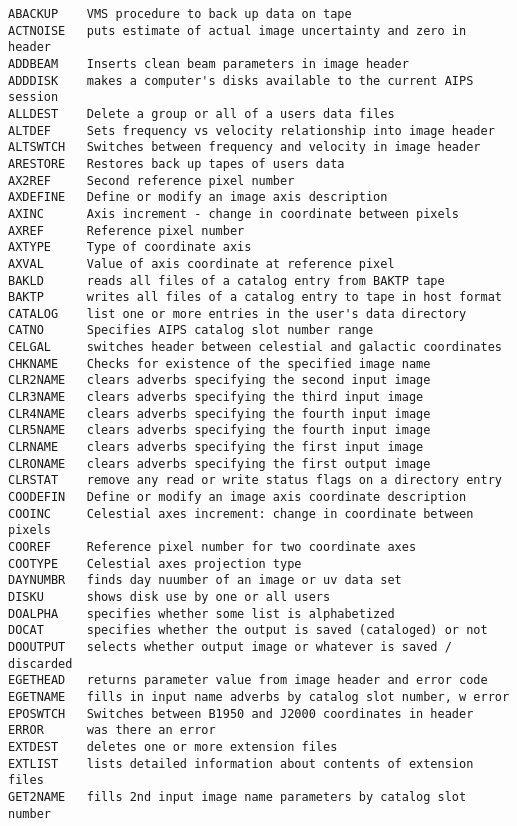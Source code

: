 \vskip 0.5pt
\bbve\begin{verbatim}
ABACKUP    VMS procedure to back up data on tape
ACTNOISE   puts estimate of actual image uncertainty and zero in header
ADDBEAM    Inserts clean beam parameters in image header
ADDDISK    makes a computer's disks available to the current AIPS session
ALLDEST    Delete a group or all of a users data files
ALTDEF     Sets frequency vs velocity relationship into image header
ALTSWTCH   Switches between frequency and velocity in image header
ARESTORE   Restores back up tapes of users data
AX2REF     Second reference pixel number
AXDEFINE   Define or modify an image axis description
AXINC      Axis increment - change in coordinate between pixels
AXREF      Reference pixel number
AXTYPE     Type of coordinate axis
AXVAL      Value of axis coordinate at reference pixel
BAKLD      reads all files of a catalog entry from BAKTP tape
BAKTP      writes all files of a catalog entry to tape in host format
CATALOG    list one or more entries in the user's data directory
CATNO      Specifies AIPS catalog slot number range
CELGAL     switches header between celestial and galactic coordinates
CHKNAME    Checks for existence of the specified image name
CLR2NAME   clears adverbs specifying the second input image
CLR3NAME   clears adverbs specifying the third input image
CLR4NAME   clears adverbs specifying the fourth input image
CLR5NAME   clears adverbs specifying the fourth input image
CLRNAME    clears adverbs specifying the first input image
CLRONAME   clears adverbs specifying the first output image
CLRSTAT    remove any read or write status flags on a directory entry
COODEFIN   Define or modify an image axis coordinate description
COOINC     Celestial axes increment: change in coordinate between pixels
COOREF     Reference pixel number for two coordinate axes
COOTYPE    Celestial axes projection type
DAYNUMBR   finds day nuumber of an image or uv data set
DISKU      shows disk use by one or all users
DOALPHA    specifies whether some list is alphabetized
DOCAT      specifies whether the output is saved (cataloged) or not
DOOUTPUT   selects whether output image or whatever is saved / discarded
EGETHEAD   returns parameter value from image header and error code
EGETNAME   fills in input name adverbs by catalog slot number, w error
EPOSWTCH   Switches between B1950 and J2000 coordinates in header
ERROR      was there an error
EXTDEST    deletes one or more extension files
EXTLIST    lists detailed information about contents of extension files
GET2NAME   fills 2nd input image name parameters by catalog slot number

\end{verbatim}
